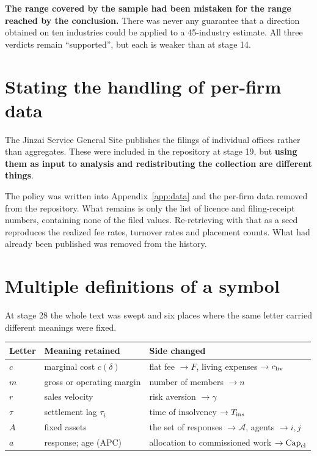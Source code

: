\textbf{The range covered by the sample had been mistaken for the range reached by the conclusion.}
There was never any guarantee that a direction obtained on ten industries could be applied to a
45-industry estimate. All three verdicts remain ``supported'', but each is weaker than at stage 14.

\section{Stating the handling of per-firm data}

The Jinzai Service General Site publishes the filings of individual offices rather than aggregates.
These were included in the repository at stage 19, but \textbf{using them as input to analysis and
redistributing the collection are different things}.

The policy was written into Appendix~\ref{app:data} and the per-firm data removed from the
repository. What remains is only the list of licence and filing-receipt numbers, containing none of
the filed values. Re-retrieving with that as a seed reproduces the realized fee rates, turnover
rates and placement counts. What had already been published was removed from the history.

\section{Multiple definitions of a symbol}
\label{sec:rev-symbols}

At stage 28 the whole text was swept and six places where the same letter carried different
meanings were fixed.

\begin{center}
\begin{tabularx}{\textwidth}{@{}llX@{}}
\toprule
Letter & Meaning retained & Side changed \\
\midrule
$c$ & marginal cost $c(\delta)$ & flat fee $\to F$, living expenses $\to c_{\rm liv}$ \\
$m$ & gross or operating margin & number of members $\to n$ \\
$r$ & sales velocity & risk aversion $\to \gamma$ \\
$\tau$ & settlement lag $\tau_i$ & time of insolvency $\to T_{\mathrm{ins}}$ \\
$A$ & fixed assets & the set of responses $\to \mathcal{A}$, agents $\to i,j$ \\
$a$ & response; age (APC) & allocation to commissioned work $\to \mathrm{Cap}_{\mathrm{cl}}$ \\
\bottomrule
\end{tabularx}
\label{tab:symbol-collisions}
\end{center}

